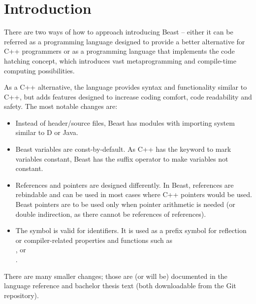 \documentclass{ExcelAtFIT}
\affiliation{*%
  \href{mailto: xcejch00@stud.fit.vutbr.cz}{xcejch00@stud.fit.vutbr.cz},
  \textit{Faculty of Information Technology, Brno University of Technology}}
\begin{document}
\startdocument



\section{Introduction}

There are two ways of how to approach introducing Beast -- either it can be referred as a programming language designed to provide a better alternative for C++ programmers or as a programming language that implements the code hatching concept, which introduces vast metaprogramming and compile-time computing possibilities.

As a C++ alternative, the language provides syntax and functionality similar to C++, but adds features designed to increase coding comfort, code readability and safety. The most notable changes are:
\begin{itemize}
	\item Instead of header/source files, Beast has modules with importing system similar to D or Java.
	\item Beast variables are const-by-default. As C++ has the  keyword to mark variables constant, Beast has the  suffix operator to make variables not constant.
	\item References and pointers are designed differently. In Beast, references are rebindable and can be used in most cases where C++ pointers would be used. Beast pointers are to be used only when pointer arithmetic is needed (or double indirection, as there cannot be references of references).
	\item The \inlineCode{#} symbol is valid for identifiers. It is used as a prefix symbol for reflection or compiler-related properties and functions such as \\,  or \\.
\end{itemize}

There are many smaller changes; those are (or will be) documented in the language reference and bachelor thesis text (both downloadable from the Git repository).
\end{document}
